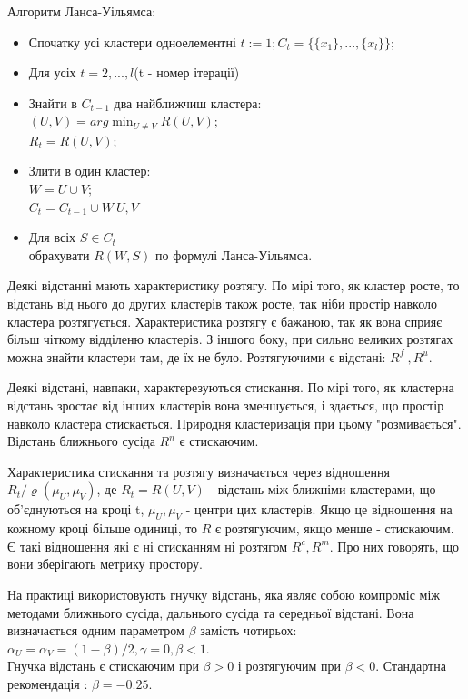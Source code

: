 \documentclass[a4paper,14pt,russian]{extreport}
\begin{document}
\par 
Алгоритм Ланса-Уільямса:  \\
\begin{itemize}

\item Спочатку усі кластери одноелементні  $ t:=1;  C_t = \big\{ \{ x_1 \} ,..., \{ x_l \} \big\}; $ 
\item Для усіх $t = 2, ..., l$(t - номер ітерації)
\item Знайти в  $C_{t-1}$ два найближчиш кластера: \\ $(U,V) = arg \min_{U \ne V}R(U,V);$\\
$R_t = R(U,V);$

\item Злити в один кластер: \\
$W = U \cup V;$\\
$ C_t = C_{t-1} \cup {W} \ {U,V}$
\item Для всіх $S \in C_t$ \\ обрахувати $R(W,S)$ по формулі Ланса-Уільямса.
\end{itemize}
\par 
	Деякі відстанні мають характеристику розтягу. По мірі того, як кластер росте, то відстань від нього до других кластерів також росте, так ніби простір навколо кластера розтягується. Характеристика розтягу є бажаною, так як вона сприяє більш чіткому відділеню кластерів. З іншого боку, при сильно великих розтягах можна знайти кластери там, де їх не було. Розтягуючими є відстані: $R^f \ , R^u$.\par 
	
	Деякі відстані, навпаки,  характерезуються стискання. По мірі того, як кластерна відстань зростає від інших кластерів вона зменшується, і здається, що простір навколо кластера стискається. Природня кластеризація при цьому "розмивається". Відстань ближнього сусіда $R^n$ є стискаючим. \par 
	Характеристика стискання та розтягу визначається через відношення $R_t/ \varrho(\mu_U, \mu_V)$, де $R_t = R(U,V)$ - відстань між ближніми кластерами, що об'єднуються на кроці t, $\mu_U, \mu_V$ - центри цих кластерів. Якщо це відношення на кожному кроці більше одиниці, то $R$ є розтягуючим, якщо менше - стискаючим. Є такі відношення які є ні стисканням ні розтягом $R^c, R^m$. Про них говорять, що вони зберігають метрику простору.\par 
	На практиці використовують гнучку відстань, яка являє собою компроміс між методами ближнього сусіда, дальнього сусіда та середньої відстані. Вона визначається одним параметром  $\beta$ замість чотирьох: \\
	$\alpha_U = \alpha_V = (1-\beta)/2, \gamma = 0, \beta < 1$.
	\\
	Гнучка відстань є стискаючим при $\beta > 0$ і  розтягуючим при $\beta < 0$. Стандартна рекомендація :  $\beta = -0.25$.\cite{wiliams}
\end{document}
